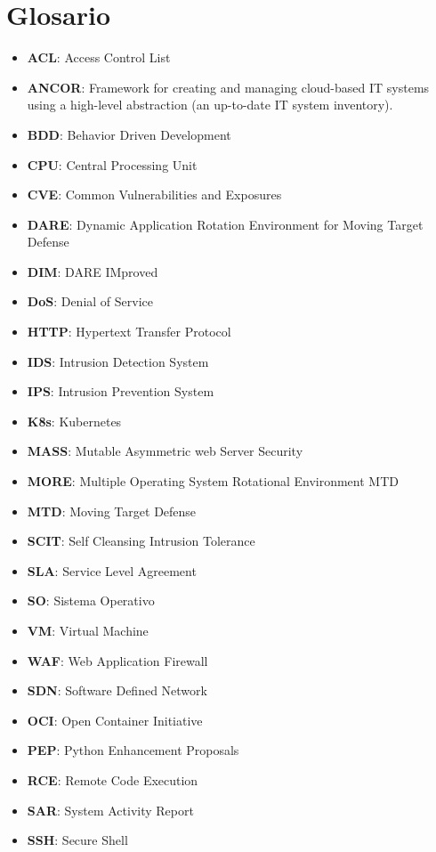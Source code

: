 \chapter{Glosario}

\begin{itemize}
    \item \textbf{ACL}: Access Control List
    \item \textbf{ANCOR}: Framework for creating and managing cloud-based IT systems using a high-level abstraction (an up-to-date IT system inventory).
    \item \textbf{BDD}: Behavior Driven Development
    \item \textbf{CPU}: Central Processing Unit
    \item \textbf{CVE}: Common Vulnerabilities and Exposures
    \item \textbf{DARE}: Dynamic Application Rotation Environment for Moving Target Defense
    \item \textbf{DIM}: DARE IMproved
    \item \textbf{DoS}: Denial of Service
    \item \textbf{HTTP}: Hypertext Transfer Protocol
    \item \textbf{IDS}: Intrusion Detection System
    \item \textbf{IPS}: Intrusion Prevention System
    \item \textbf{K8s}: Kubernetes
    \item \textbf{MASS}: Mutable Asymmetric web Server Security
    \item \textbf{MORE}: Multiple Operating System Rotational Environment MTD
    \item \textbf{MTD}: Moving Target Defense
    \item \textbf{SCIT}: Self Cleansing Intrusion Tolerance
    \item \textbf{SLA}: Service Level Agreement
    \item \textbf{SO}: Sistema Operativo
    \item \textbf{VM}: Virtual Machine
    \item \textbf{WAF}: Web Application Firewall
    \item \textbf{SDN}: Software Defined Network
    \item \textbf{OCI}: Open Container Initiative
    \item \textbf{PEP}: Python Enhancement Proposals
    \item \textbf{RCE}: Remote Code Execution
    \item \textbf{SAR}: System Activity Report
    \item \textbf{SSH}: Secure Shell
  \end{itemize}
  
